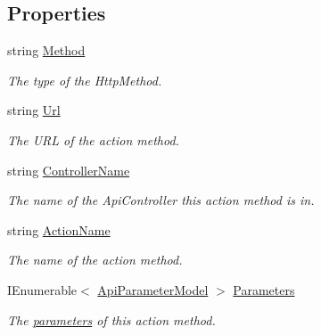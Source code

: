 \subsection*{Properties}
\begin{DoxyCompactItemize}
\item 
string \hyperlink{classCqrs_1_1WebApi_1_1Controllers_1_1ClientController_1_1ApiMethodModel_ae5e755bb50395fb205f2fef1e0996c9c_ae5e755bb50395fb205f2fef1e0996c9c}{Method}
\begin{DoxyCompactList}\small\item\em The type of the Http\+Method. \end{DoxyCompactList}\item 
string \hyperlink{classCqrs_1_1WebApi_1_1Controllers_1_1ClientController_1_1ApiMethodModel_acc052a6baebad1db57f1cae2dcc79261_acc052a6baebad1db57f1cae2dcc79261}{Url}
\begin{DoxyCompactList}\small\item\em The U\+RL of the action method. \end{DoxyCompactList}\item 
string \hyperlink{classCqrs_1_1WebApi_1_1Controllers_1_1ClientController_1_1ApiMethodModel_a3d87deeca069fb2c77a65d7f554e8a53_a3d87deeca069fb2c77a65d7f554e8a53}{Controller\+Name}
\begin{DoxyCompactList}\small\item\em The name of the Api\+Controller this action method is in. \end{DoxyCompactList}\item 
string \hyperlink{classCqrs_1_1WebApi_1_1Controllers_1_1ClientController_1_1ApiMethodModel_a9c87230b81015b0c331f1a7177ff23d2_a9c87230b81015b0c331f1a7177ff23d2}{Action\+Name}
\begin{DoxyCompactList}\small\item\em The name of the action method. \end{DoxyCompactList}\item 
I\+Enumerable$<$ \hyperlink{classCqrs_1_1WebApi_1_1Controllers_1_1ClientController_1_1ApiParameterModel}{Api\+Parameter\+Model} $>$ \hyperlink{classCqrs_1_1WebApi_1_1Controllers_1_1ClientController_1_1ApiMethodModel_a0da38a890013a8363ae1a2361de1c45b_a0da38a890013a8363ae1a2361de1c45b}{Parameters}
\begin{DoxyCompactList}\small\item\em The \hyperlink{classCqrs_1_1WebApi_1_1Controllers_1_1ClientController_1_1ApiParameterModel}{parameters} of this action method. \end{DoxyCompactList}\end{DoxyCompactItemize}


